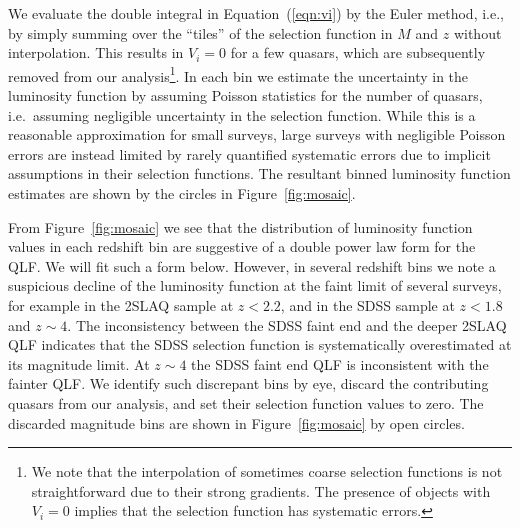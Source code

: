 \documentclass[fleqn,usenatbib]{mnras}
\begin{document}
We evaluate the double integral in Equation~(\ref{eqn:vi}) by the Euler method,
i.e., by simply summing over the ``tiles'' of the selection function in $M$ and $z$
without interpolation.
This results in $V_i=0$ for a few quasars, which are subsequently removed
from our analysis\footnote{
  We note that the interpolation of sometimes coarse
  selection functions is not straightforward due to their strong gradients.
  The presence of objects with $V_i=0$ implies that the selection function has systematic errors.}.
In each bin we estimate the uncertainty in the luminosity function by
assuming Poisson statistics \citep{1986ApJ...303..336G} for the number
of quasars, i.e.\ assuming negligible uncertainty in the selection function.
While this is a reasonable approximation for small surveys, large surveys
with negligible Poisson errors are instead limited by rarely quantified systematic
errors due to implicit assumptions in their selection functions.
The resultant binned luminosity function estimates
are shown by the circles in Figure~\ref{fig:mosaic}.

From Figure~\ref{fig:mosaic} we see that the distribution of luminosity
function values in each redshift bin are suggestive of a double power
law form for the QLF.  We will fit such a form below. 
However, in several redshift bins we note a suspicious decline of the
luminosity function at the faint limit of several surveys, for example in
the 2SLAQ sample at $z<2.2$, and in the SDSS sample at $z<1.8$ and $z\sim 4$.
The inconsistency between the SDSS faint end and the deeper
2SLAQ QLF indicates that the SDSS selection function is
systematically overestimated at its magnitude limit.
At $z\sim 4$ the SDSS faint end QLF is inconsistent with the fainter
\citet{2011ApJ...728L..26G} QLF. We identify such discrepant bins
by eye, discard the contributing quasars from our analysis, and set their
selection function values to zero.
The discarded magnitude bins are shown in Figure~\ref{fig:mosaic} by
open circles.
\end{document}
